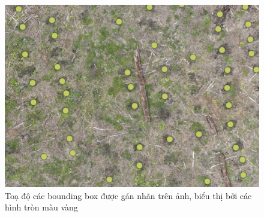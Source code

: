 \documentclass[a4paper, 12pt]{report}
\begin{document}
 \begin{figure}[!htb]
	\centering
	\includegraphics[width=0.7\linewidth]{Images/qgisb}
	\caption{Toạ độ các bounding box được gán nhãn trên ảnh,  biểu thị bởi các hình tròn màu vàng}
	\label{fig:1b}
\end{figure}


\end{document}

